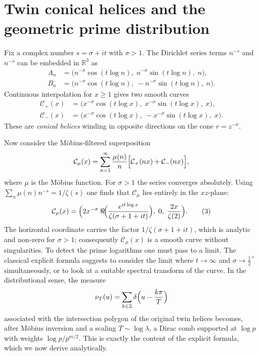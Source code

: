 \documentclass[12pt,a4paper]{article}
\newcommand{\R}{\mathbb{R}}
\newcommand{\Z}{\mathbb{Z}}
\begin{document}
\section{Twin conical helices and the geometric prime distribution}
Fix a complex number $s = \sigma + i t$ with $\sigma > 1$.  The Dirichlet series terms $n^{-s}$ and $n^{-\bar s}$ can be embedded in $\R^3$ as
\begin{align*}
A_n &= \bigl( n^{-\sigma}\cos(t\log n),\; n^{-\sigma}\sin(t\log n),\; n \bigr),\\
B_n &= \bigl( n^{-\sigma}\cos(t\log n),\; -n^{-\sigma}\sin(t\log n),\; n \bigr).
\end{align*}
Continuous interpolation for $x\ge 1$ gives two smooth curves
\begin{align}
\mathcal{C}_+(x) &= \bigl( x^{-\sigma}\cos(t\log x),\; x^{-\sigma}\sin(t\log x),\; x \bigr), \label{C+}\\
\mathcal{C}_-(x) &= \bigl( x^{-\sigma}\cos(t\log x),\; -x^{-\sigma}\sin(t\log x),\; x \bigr). \label{C-}
\end{align}
These are \emph{conical helices} winding in opposite directions on the cone $r = z^{-\sigma}$.

Now consider the M\"obius‑filtered superposition
\[
\mathcal{C}_\mu(x) = \sum_{n=1}^{\infty} \frac{\mu(n)}{n}\Bigl[ \mathcal{C}_+(n x) + \mathcal{C}_-(n x) \Bigr],
\]
where $\mu$ is the M\"obius function.  For $\sigma>1$ the series converges absolutely.  Using $\sum_{n}\mu(n)n^{-s} = 1/\zeta(s)$ one finds that $\mathcal{C}_\mu$ lies entirely in the $xz$-plane:
\[
\mathcal{C}_\mu(x) = \Bigl( 2x^{-\sigma}\,\Re\!\Bigl( \frac{e^{i t\log x}}{\zeta(\sigma+1+it)} \Bigr),\; 0,\; \frac{2x}{\zeta(2)} \Bigr).
\tag{3}
\]
The horizontal coordinate carries the factor $1/\zeta(\sigma+1+it)$, which is analytic and non‑zero for $\sigma>1$; consequently $\mathcal{C}_\mu(x)$ is a smooth curve without singularities.  To detect the prime logarithms one must pass to a limit.  The classical explicit formula suggests to consider the limit where $t\to\infty$ and $\sigma\to\frac12^+$ simultaneously, or to look at a suitable spectral transform of the curve.  In the distributional sense, the measure
\[
\nu_T(u) = \sum_{k\in\Z} \delta\Bigl(u - \frac{k\pi}{T}\Bigr)
\]
associated with the intersection polygon of the original twin helices becomes, after M\"obius inversion and a scaling $T\sim\log\lambda$, a Dirac comb supported at $\log p$ with weights $\log p/p^{m/2}$.  This is exactly the content of the explicit formula, which we now derive analytically.
\end{document}
